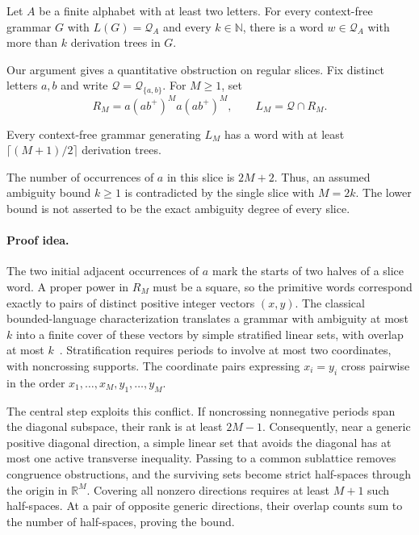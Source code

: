 \documentclass[a4paper,USenglish,cleveref,autoref]{lipics-v2021}
\newcommand{\N}{\mathbb N}
\newcommand{\R}{\mathbb R}
\newcommand{\Q}{\mathcal Q}
\begin{document}
\begin{theorem}\label{thm:main}
Let $A$ be a finite alphabet with at least two letters.
For every context-free grammar $G$ with $L(G)=\Q_A$ and every $k\in\N$, there is a word $w\in\Q_A$ with more than $k$ derivation trees in $G$.
\end{theorem}

Our argument gives a quantitative obstruction on regular slices.
Fix distinct letters $a,b$ and write $\Q=\Q_{\{a,b\}}$.
For $M\geq 1$, set
\begin{equation}\label{eq:slice}
 R_M=a(ab^+)^M a(ab^+)^M,\qquad L_M=\Q\cap R_M.
\end{equation}
\begin{theorem}\label{thm:slice}
Every context-free grammar generating $L_M$ has a word with at least $\lceil(M+1)/2\rceil$ derivation trees.
\end{theorem}
The number of occurrences of $a$ in this slice is $2M+2$.
Thus, an assumed ambiguity bound $k\geq1$ is contradicted by the single slice with $M=2k$.
The lower bound is not asserted to be the exact ambiguity degree of every slice.

\paragraph{Proof idea.}
The two initial adjacent occurrences of $a$ mark the starts of two halves of a slice word.
A proper power in $R_M$ must be a square, so the primitive words correspond exactly to pairs of distinct positive integer vectors $(x,y)$.
The classical bounded-language characterization translates a grammar with ambiguity at most $k$ into a finite cover of these vectors by simple stratified linear sets, with overlap at most $k$~\cite{GinsburgUllian1966,Rosenberg1970,Koechlin2022}.
Stratification requires periods to involve at most two coordinates, with noncrossing supports.
The coordinate pairs expressing $x_i=y_i$ cross pairwise in the order $x_1,\ldots,x_M,y_1,\ldots,y_M$.

The central step exploits this conflict.
If noncrossing nonnegative periods span the diagonal subspace, their rank is at least $2M-1$.
Consequently, near a generic positive diagonal direction, a simple linear set that avoids the diagonal has at most one active transverse inequality.
Passing to a common sublattice removes congruence obstructions, and the surviving sets become strict half-spaces through the origin in $\R^M$.
Covering all nonzero directions requires at least $M+1$ such half-spaces.
At a pair of opposite generic directions, their overlap counts sum to the number of half-spaces, proving the bound.
\end{document}
